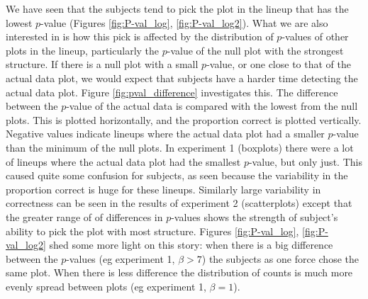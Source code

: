 \documentclass[12pt]{article}
\newcommand{\blue}[1]{{\color{blue} #1}} %
\begin{document}
We have seen that the subjects tend to pick the plot in the lineup that has the lowest $p$-value (Figures \ref{fig:P-val_log}, \ref{fig:P-val_log2}). What we are also interested in  is how this pick is affected by the distribution  of $p$-values of other plots in the lineup, particularly the $p$-value of the null plot with the strongest structure. If there is a null plot with a small $p$-value, or one close to that of the actual data plot, we would expect that subjects have a harder time detecting the actual data plot. Figure \ref{fig:pval_difference} investigates this. The difference between the $p$-value of the actual data is compared with the lowest from the null plots. This is plotted horizontally, and the proportion correct is plotted vertically. Negative values indicate lineups where the actual data plot had a smaller $p$-value than the minimum of the null plots. In experiment 1 (boxplots) there were a lot of lineups where the actual data plot had the smallest $p$-value, but only just. This caused quite some confusion for subjects, as seen because the variability in the proportion correct is huge for these lineups. Similarly large variability in correctness can be seen in the results of experiment 2 (scatterplots) except that the greater range of of differences in $p$-values shows the strength of subject's ability to pick the plot with most structure. Figures \ref{fig:P-val_log}, \ref{fig:P-val_log2} shed some more light on this story: when there is a big difference between the $p$-values (eg experiment 1, $\beta>7$) the subjects as one force chose the same plot. When there is less difference the distribution of counts is much more evenly spread between plots (eg experiment 1, $\beta=1$). 

\end{document}
